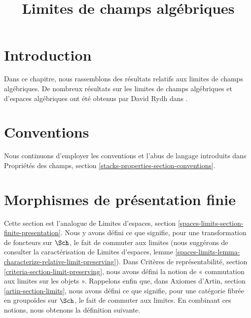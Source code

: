 

%


\title{Limites de champs algébriques}


\maketitle

\label{section-phantom}

\tableofcontents

\section{Introduction}
\label{section-introduction}

\noindent
Dans ce chapitre, nous rassemblons des résultats relatifs aux limites de
champs algébriques. De nombreux résultats sur les limites de champs
algébriques et d'espaces algébriques ont été obtenus par David Rydh dans
\cite{rydh_approx}.


\section{Conventions}
\label{section-conventions}

\noindent
Nous continuons d'employer les conventions et l'abus de langage introduits
dans Propriétés des champs, section
\ref{stacks-properties-section-conventions}.







\section{Morphismes de présentation finie}
\label{section-finite-presentation}

\noindent
Cette section est l'analogue de Limites d'espaces, section
\ref{spaces-limits-section-finite-presentation}. Nous y avons défini ce que
signifie, pour une transformation de foncteurs sur $\Sch$, le fait de commuter
aux limites (nous suggérons de consulter la caractérisation de Limites
d'espaces, lemme
\ref{spaces-limits-lemma-characterize-relative-limit-preserving}). Dans
Critères de représentabilité, section \ref{criteria-section-limit-preserving},
nous avons défini la notion de « commutation aux limites sur les objets ».
Rappelons enfin que, dans Axiomes d'Artin, section \ref{artin-section-limits},
nous avons défini ce que signifie, pour une catégorie fibrée en groupoïdes sur
$\Sch$, le fait de commuter aux limites. En combinant ces notions, nous
obtenons la définition suivante.

